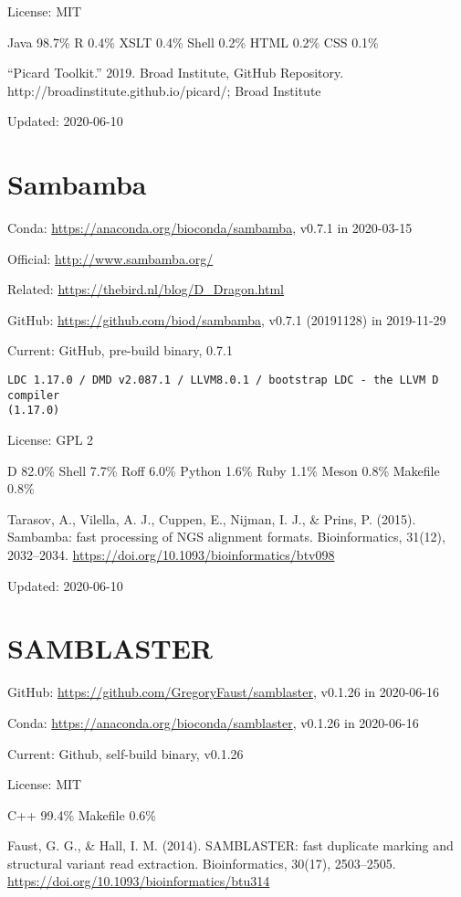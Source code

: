\documentclass[]{article}
\begin{document}
License: MIT

Java 98.7\% R 0.4\% XSLT 0.4\% Shell 0.2\% HTML 0.2\% CSS 0.1\% 

``Picard Toolkit.'' 2019. Broad Institute, GitHub Repository. http://broadinstitute.github.io/picard/; Broad Institute

Updated: 2020-06-10

\section{Sambamba}

Conda: \url{https://anaconda.org/bioconda/sambamba}, v0.7.1 in 2020-03-15 

Official: \url{http://www.sambamba.org/}

Related: \url{https://thebird.nl/blog/D_Dragon.html}

GitHub: \url{https://github.com/biod/sambamba}, v0.7.1 (20191128) in 2019-11-29

Current: GitHub, pre-build binary, 0.7.1

\begin{verbatim}
LDC 1.17.0 / DMD v2.087.1 / LLVM8.0.1 / bootstrap LDC - the LLVM D compiler
(1.17.0)
\end{verbatim}

License: GPL 2

D 82.0\% Shell 7.7\% Roff 6.0\% Python 1.6\% Ruby 1.1\% Meson 0.8\% Makefile 0.8\%

Tarasov, A., Vilella, A. J., Cuppen, E., Nijman, I. J., \& Prins, P. (2015). Sambamba: fast processing of NGS alignment formats. Bioinformatics, 31(12), 2032–2034. \url{https://doi.org/10.1093/bioinformatics/btv098}

Updated: 2020-06-10

\section{SAMBLASTER}

GitHub: \url{https://github.com/GregoryFaust/samblaster}, v0.1.26 in 2020-06-16

Conda: \url{https://anaconda.org/bioconda/samblaster}, v0.1.26 in 2020-06-16

Current: Github, self-build binary, v0.1.26

License: MIT

C++ 99.4\% Makefile 0.6\%

Faust, G. G., \& Hall, I. M. (2014). SAMBLASTER: fast duplicate marking and structural variant read extraction. Bioinformatics, 30(17), 2503–2505. \url{https://doi.org/10.1093/bioinformatics/btu314}
\end{document}
